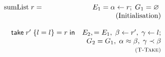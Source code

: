 \begin{figure}
    \centering
    \[
        \begin{array}{lr}
            \text{sumList}\; r =
                & E_1 = \alpha \leftarrow r;\; G_1 = \varnothing\; \\
                & \text{(Initialisation)} \\
                \\
            \hspace{1em}    \textsf{take}\; r'\; \{ l = l \} = r\; \textsf{in} 
                & E_2, = E_1,\; \beta \leftarrow r',\; \gamma \leftarrow l;  \\
                & G_2 = G_1,\; \alpha \approx \beta,\; \gamma \prec \beta \\
                & \textsc{\footnotesize (T-Take)}\\


\end{array}\]
\end{figure}
